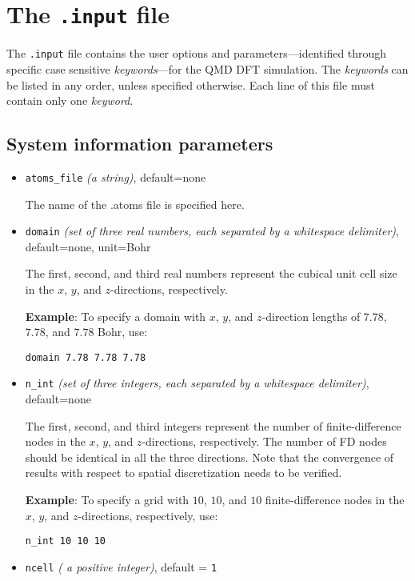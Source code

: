\documentclass[12pt]{report}
\begin{document}
\section{The \texttt{.input} file}\label{section:input}
The \texttt{.input} file contains the user options and parameters---identified through specific case sensitive \emph{keywords}---for the QMD DFT simulation. The \emph{keywords} can be listed in any order, unless specified otherwise. Each line of this file must contain only one \emph{keyword}. 


\subsection{System information parameters}

\begin{itemize}
\item \texttt{atoms\_file} {\it{(a string)}}, default=none

The name of the .atoms file is specified here.

\item \texttt{domain} {\it{(set of three real numbers, each separated by a whitespace delimiter)}}, default=none, unit=Bohr 

The first, second, and third real numbers represent the cubical unit cell size in the $x$, $y$, and $z$-directions, respectively. 

{\bf{Example}}: To specify a domain with $x$, $y$, and $z$-direction lengths of $7.78$, $7.78$, and $7.78$ Bohr, use: 

\texttt{domain 7.78 7.78 7.78}

\item\texttt{n\_int} {\it{(set of three integers, each separated by a whitespace delimiter)}}, default=none

The first, second, and third integers represent the number of finite-difference nodes in the $x$, $y$, and $z$-directions, respectively. The number of FD nodes should be identical in all the three directions. Note that the convergence of results with respect to spatial discretization needs to be verified. 

{\bf{Example}}: To specify a grid with $10$, $10$, and $10$ finite-difference nodes in the $x$, $y$, and $z$-directions, respectively, use:  

\texttt{n\_int 10 10 10}

\item \texttt{ncell} {\it{( a positive integer)}}, default = \texttt{1}


\end{itemize}
\end{document}
